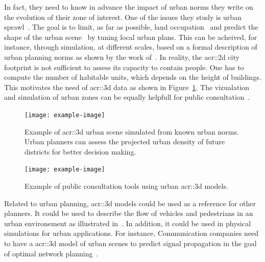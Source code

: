             In fact, they need to know in advance the impact of urban norms they write on the evolution of their zone of interest. 
            One of the issues they study is urban sprawl~\parencite{ludlow2006urban}.
            The goal is to limit, as far as possible, land occupation~\parencite{TANNIER2012128} and predict the shape of the urban scene~\parencite{brasebin20183d} by tuning local urban plans.
            This can be acheived, for instance, through simulation, at different scales, based on a formal description of urban planning norms as shown by the work of~\textcite{Colomb17a}.
            In reality, the \gls{acr::2d} city footprint is not sufficient to assess its capacity to contain people.
            One has to compute the number of habitable units, which depends on the height of buildings.
            This motivates the need of \gls{acr::3d} data as shown in Figure~\ref{fig::3d_simulation}.
            The  vizualation and simulation of urban zones can be equally helpfull for public consultation~\parencite{WU2010291}.\\
            \begin{figure}[htpb]
                \centering
                \texttt{[image: example-image]}            
                \caption{
                    \label{fig::3d_simulation} Example of \gls{acr::3d} urban scene simulated from known urban norms.
                    Urban planners can assess the projected urban density of future districts for better decision making.
                }
            \end{figure}
            \begin{figure}[htpb]
                \centering
                \texttt{[image: example-image]}            
                \caption{
                    \label{fig::public_consultation} Example of public consultation tools using urban \gls{acr::3d} models.
                }
            \end{figure}
            Related to urban planning, \gls{acr::3d} models could be used as a reference for other planners.
            It could be used to describe the flow of vehicles and pedestrians in an urban environement as illustrated in~\textcite{Vanhoey:2017:VVS:3084363.3085085}.
            In addition, it could be used in physical simulations for urban applications.
            For instance, Communication companies need to have a \gls{acr::3d} model of urban scenes to predict signal propagation in the goal of optimal network planning~\parencite{yun2007radio}.
